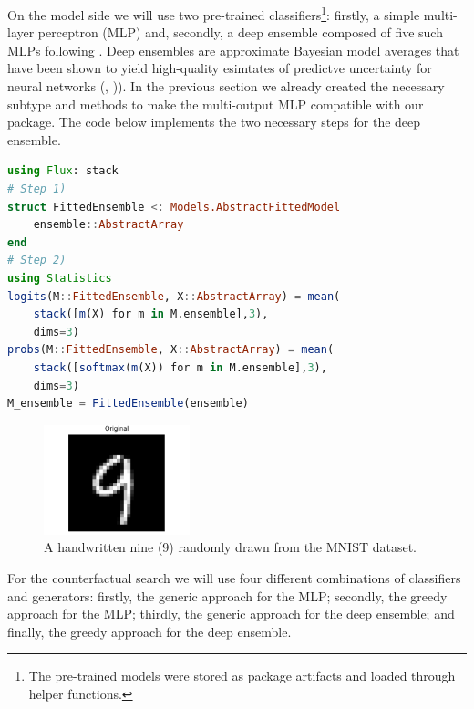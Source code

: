 \documentclass{juliacon}
\begin{document}
On the model side we will use two pre-trained classifiers\footnote{The
  pre-trained models were stored as package artifacts and loaded through
  helper functions.}: firstly, a simple multi-layer perceptron (MLP)
and, secondly, a deep ensemble composed of five such MLPs following
\cite{schut2021generating}. Deep ensembles are approximate Bayesian
model averages that have been shown to yield high-quality esimtates of
predictve uncertainty for neural networks (\cite{wilson2019case.pdf},
\cite{lakshminarayanan2016simple})). In the previous section we already
created the necessary subtype and methods to make the multi-output MLP
compatible with our package. The code below implements the two necessary
steps for the deep ensemble.

\begin{lstlisting}[language=Julia, escapechar=@]
using Flux: stack
# Step 1)
struct FittedEnsemble <: Models.AbstractFittedModel
    ensemble::AbstractArray
end
# Step 2)
using Statistics
logits(M::FittedEnsemble, X::AbstractArray) = mean(
    stack([m(X) for m in M.ensemble],3), 
    dims=3)
probs(M::FittedEnsemble, X::AbstractArray) = mean(
    stack([softmax(m(X)) for m in M.ensemble],3),
    dims=3)
M_ensemble = FittedEnsemble(ensemble)
\end{lstlisting}

\begin{figure}

{\centering \includegraphics[width=1.66667in,height=1.25in]{www/mnist_original.png}

}

\caption{\label{fig-mnist-orig}A handwritten nine (9) randomly drawn
from the MNIST dataset.}

\end{figure}

For the counterfactual search we will use four different combinations of
classifiers and generators: firstly, the generic approach for the MLP;
secondly, the greedy approach for the MLP; thirdly, the generic approach
for the deep ensemble; and finally, the greedy approach for the deep
ensemble.
\end{document}

